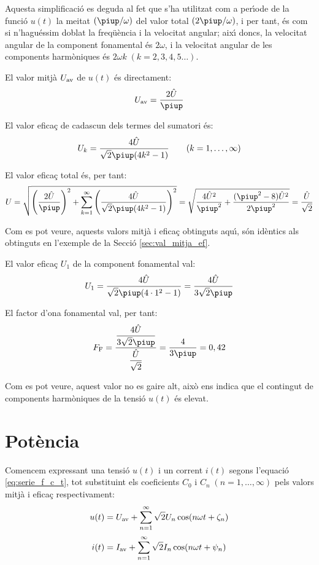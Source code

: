 \begin{exemple}
Aquesta simplificaci\'{o} es deguda al fet que s'ha utilitzat com a
per\'{\i}ode de la funci\'{o} $u(t)$ la meitat $(\piup/\omega)$ del valor total
$(2\piup/\omega)$, i per tant, \'{e}s com si n'hagu\'{e}ssim doblat la
freq\"{u}\`{e}ncia i la velocitat angular; aix\'{\i} doncs, la velocitat angular
de la component fonamental \'{e}s $2\omega$, i la velocitat angular de
les components harm\`{o}niques \'{e}s $2\omega k \;(k=2,3,4,5\ldots)$.

El valor mitj\`{a} $U_\mathrm{av}$ de $u(t)$ \'{e}s directament:
\[
    U\ped{av} = \frac{2\hat{U}}{\piup}
\]

El valor efica\c{c} de cadascun dels termes del sumatori \'{e}s:
\[
    U_k =\frac{4\hat{U}}{\sqrt{2}\piup(4k^2-1)}
    \qquad(k=1,\ldots,\infty)
\]

El valor efica\c{c} total \'{e}s, per tant:
\[
    U=\sqrt{\left(\frac{2\hat{U}}{\piup}\right)^2 + \sum_{k=1}^\infty
    \left(\frac{4\hat{U}}{\sqrt{2}\piup(4k^2-1)}\right)^2} =
    \sqrt{\frac{4\hat{U}^2}{\piup^2} + \frac{(\piup^2-8)\hat{U}^2}{2\piup^2}
    }= \frac{\hat{U}}{\sqrt{2}}
\]

Com es pot veure, aquests valors mitj\`{a} i efica\c{c} obtinguts aqu\'{\i}, s\'{o}n
id\`{e}ntics als obtinguts en l'exemple de la Secci\'{o}
\ref{sec:val_mitja_ef}.

El valor efica\c{c} $U_1$ de la component fonamental val:
\[
    U_1 =\frac{4\hat{U}}{\sqrt{2}\piup(4\cdot 1^2-1)} =
    \frac{4\hat{U}}{3\sqrt{2}\piup}
\]

El factor d'ona fonamental val, per tant:
\[
    F\ped{F} =
    \frac{\dfrac{4\hat{U}}{3\sqrt{2}\piup}}{\dfrac{\hat{U}}{\sqrt{2}}}
    =\frac{4}{3\piup} = 0,{42}
\]

Com es pot veure, aquest valor no es gaire alt, aix\`{o} ens indica que
el contingut de components harm\`{o}niques de la tensi\'{o} $u(t)$ \'{e}s
elevat.

\end{exemple}

\section{Pot\`{e}ncia}

Comencem expressant una tensi\'{o} $u(t)$ i un corrent $i(t)$
 segons l'equaci\'{o} \eqref{eq:serie_f_c_t}, tot substituint els
 coeficients $C_0$ i $C_n \;(n=1,\ldots,\infty)$ pels valors mitj\`{a} i efica\c{c}
 respectivament:
 \begin{align}
    u(t)  &= U_\mathrm{av} + \sum_{n=1}^\infty \sqrt{2} U_n \cos (n \omega t +
    \zeta_n)\\[0.5ex]
    i(t)  &= I_\mathrm{av} + \sum_{n=1}^\infty \sqrt{2} I_n \cos (n \omega t + \psi_n)
 \end{align}


